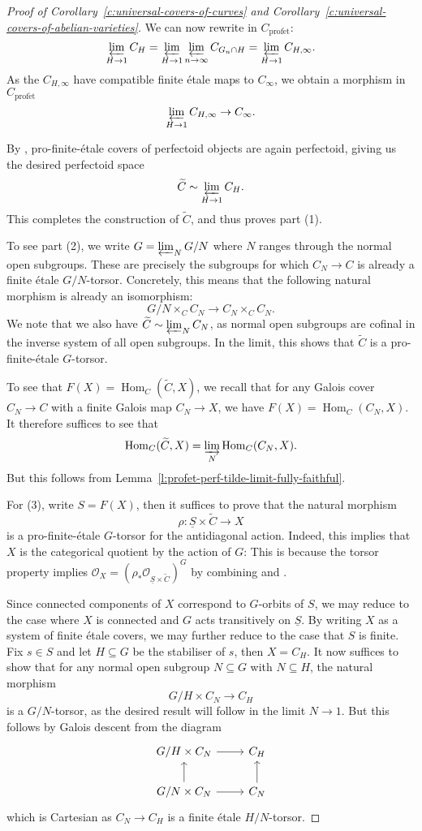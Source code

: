 \documentclass[10pt,oneside]{amsart}
\theoremstyle{definition}
\newcommand{\Hom}{\operatorname{Hom}}
\newcommand{\profet}{\operatorname{prof\acute{e}t}}
\renewcommand{\O}{\mathcal{O}}
\begin{document}
\begin{proof}[Proof of Corollary~\ref{c:universal-covers-of-curves} and Corollary~\ref{c:universal-covers-of-abelian-varieties}]
We can now rewrite in $C_{\profet}$:
\[\displaystyle\varprojlim_{H\rightarrow 1} C_H=\varprojlim_{H\rightarrow 1}\displaystyle\varprojlim_{n\rightarrow \infty} C_{G_n\cap H}=\varprojlim_{H\rightarrow 1}C_{H,\infty}.\]
As the $C_{H,\infty}$ have compatible finite \'etale maps to $C_\infty$, we obtain a morphism in $C_{\profet}$
\[\varprojlim_{H\rightarrow 1}C_{H,\infty}\rightarrow C_\infty.\]

By \cite[Lemma 4.6]{p-adic_Hodge}, pro-finite-\'etale covers of perfectoid objects are again perfectoid, giving us the desired perfectoid space 
\[ \widetilde{C}\sim\varprojlim_{H\rightarrow 1} C_H.\]
This completes the construction of $\widetilde{C}$, and thus proves part (1).

To see part (2), we write $G=\varprojlim_N G/N$ where $N$ ranges through the normal open subgroups. These are precisely the subgroups for which $C_N\to C$ is already a finite \'etale $G/N$-torsor. Concretely, this means that the following natural morphism is already an isomorphism:
\[G/N\times_C C_N\to C_N\times_CC_N.\]
We note that we also have $\widetilde{C} \sim \varprojlim_NC_N$, as normal open subgroups are cofinal in the inverse system of all open subgroups. In the limit, this shows that $\widetilde{C}$ is a pro-finite-\'etale $G$-torsor.

To see that $F(X)=\Hom_C(\widetilde{C},X)$, we recall that for any Galois cover $C_N\to C$ with a finite Galois map $C_N\to X$, we have $F(X)=\Hom_C(C_N,X)$. It therefore suffices to see that
\[\Hom_C(\widetilde{C},X)=\varinjlim_{N}\Hom_C(C_N,X).\]
But this follows from Lemma~\ref{l:profet-perf-tilde-limit-fully-faithful}.

For (3), write $S=F(X)$, then it suffices to prove that the natural morphism \[\rho:\underline{S}\times\widetilde{C}\to X\]
is a pro-finite-\'etale $G$-torsor for the antidiagonal action. Indeed, this implies that $X$ is the categorical quotient by the action of $G$: This is because the torsor property implies $\O_X = (\rho_{\ast}\O_{\underline{S}\times\widetilde{C}})^{G}$ by combining \cite[{Lemma~2.24}]{CHJ} and \cite[{Theorem~8.2.3}]{KedlayaLiu-II}.

 Since connected components of $X$ correspond to $G$-orbits of $S$, we may reduce to the case where $X$ is connected and $G$ acts transitively on $\underline{S}$. By writing $X$ as a system of finite \'etale covers, we may further reduce to the case that $S$ is finite.  Fix $s\in S$ and let $H\subseteq G$ be the stabiliser of $s$, then $X=C_H$. It now suffices to show that for any normal open subgroup $N\subseteq G$ with $N\subseteq H$, the natural morphism
\[G/H\times C_N\to C_H\]
is a $G/N$-torsor, as the desired result will follow in the limit $N\to 1$. But this follows by Galois descent from the diagram
\[
\begin{tikzcd}
	G/H\times C_N \arrow[r]           & C_H           \\
	G/N \times C_N\arrow[r] \arrow[u] & C_N \arrow[u]
\end{tikzcd}
\]
which is Cartesian as $C_N\to C_H$ is a finite \'etale $H/N$-torsor.
\end{proof}
 



 

	
	
	
\end{document}
